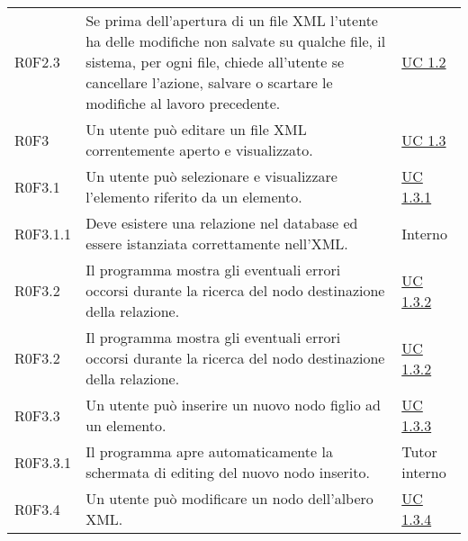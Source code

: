 \begin{center}
\begin{longtable}{p{4.2cm}!{\color{white}\vrule width 0.5mm}p{6cm}!{\color{white}\vrule width 0.5mm}p{2.5cm}!{\color{white}\vrule width 0.5mm}}
			\hspace{2mm}\hypertarget{R0F2.3}{R0F2.3} & Se prima dell'apertura di un file XML l'utente ha delle modifiche non salvate su qualche file, il sistema, per ogni file, chiede all'utente se cancellare l'azione, salvare o scartare le modifiche al lavoro precedente. & \hyperref[subsec:XEUC1.2]{UC 1.2}\\
		
	
		\hspace{0mm}\hypertarget{XER0F3}{R0F3} & Un utente può editare un file XML correntemente aperto e visualizzato. & \hyperref[subsec:XEUC1.3]{UC 1.3}\\
	
			\hspace{2mm}\hypertarget{XER0F3.1}{R0F3.1} & Un utente può selezionare e visualizzare l'elemento riferito da un elemento. & \hyperref[subsec:XEUC1.3.1]{UC 1.3.1}\\
	
				\hspace{4mm}\hypertarget{XER0F3.1.1}{R0F3.1.1} & Deve esistere una relazione nel database ed essere istanziata correttamente nell'XML. & Interno\\
	
			\hspace{2mm}\hypertarget{XER0F3.2}{R0F3.2} & Il programma mostra gli eventuali errori occorsi durante la ricerca del nodo destinazione della relazione. & \hyperref[subsec:XEUC1.3.2]{UC 1.3.2}\\
	
			\hspace{2mm}\hypertarget{XER0F3.2}{R0F3.2} & Il programma mostra gli eventuali errori occorsi durante la ricerca del nodo destinazione della relazione. & \hyperref[subsec:XEUC1.3.2]{UC 1.3.2}\\
	
			\hspace{2mm}\hypertarget{XER0F3.3}{R0F3.3} & Un utente può inserire un nuovo nodo figlio ad un elemento. & \hyperref[subsec:XEUC1.3.3]{UC 1.3.3}\\
			
				\hspace{4mm}\hypertarget{XER0F3.3.1}{R0F3.3.1} & Il programma apre automaticamente la schermata di editing del nuovo nodo inserito. & Tutor interno\\
	
			\hspace{2mm}\hypertarget{XER0F3.4}{R0F3.4} & Un utente può modificare un nodo dell'albero XML. & \hyperref[subsec:XEUC1.3.4]{UC 1.3.4}\\
			

\end{longtable}
\end{center}
